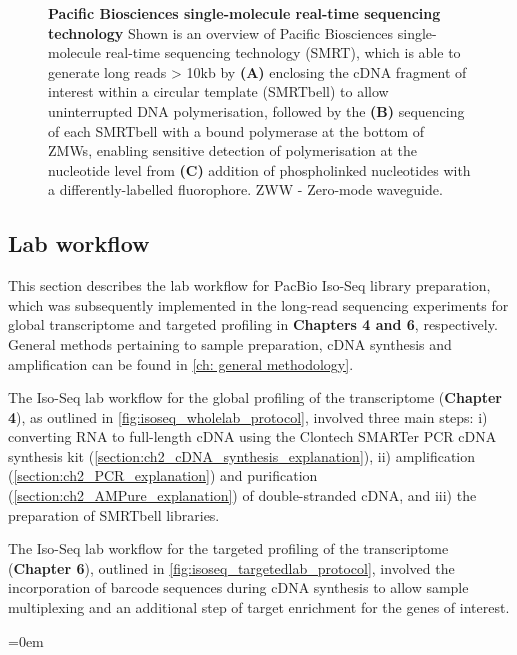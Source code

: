 \begin{figure}[!h]
	\captionsetup{width=0.95\textwidth}
	\caption[Pacific Biosciences single-molecule real-time sequencing technology]%
	{\textbf{Pacific Biosciences single-molecule real-time sequencing technology} Shown is an overview of Pacific Biosciences single-molecule real-time sequencing technology (SMRT), which is able to generate long reads > 10kb by \textbf{(A)} enclosing the cDNA fragment of interest within a circular template (SMRTbell) to allow uninterrupted DNA polymerisation,  followed by the \textbf{(B)} sequencing of each SMRTbell with a bound polymerase at the bottom of ZMWs, enabling sensitive detection of polymerisation at the nucleotide level from \textbf{(C)} addition of phospholinked nucleotides with a differently-labelled fluorophore. ZWW - Zero-mode waveguide.}
	\label{fig:Mechanism}
\end{figure}

\clearpage
\subsection{Lab workflow}
\label{chap:isoseq_labpipeline}
This section describes the lab workflow for PacBio Iso-Seq library preparation, which was subsequently implemented in the long-read sequencing experiments for global transcriptome and targeted profiling in \textbf{Chapters 4 and 6}, respectively. General methods pertaining to sample preparation, cDNA synthesis and amplification can be found in \cref{ch: general methodology}.

The Iso-Seq lab workflow for the global profiling of the transcriptome (\textbf{Chapter 4}), as outlined in \cref{fig:isoseq_wholelab_protocol}, involved three main steps: i) converting RNA to full-length cDNA using the Clontech SMARTer PCR cDNA synthesis kit (\cref{section:ch2_cDNA_synthesis_explanation}), ii) amplification (\cref{section:ch2_PCR_explanation}) and purification (\cref{section:ch2_AMPure_explanation}) of double-stranded cDNA, and iii) the preparation of SMRTbell libraries. 

The Iso-Seq lab workflow for the targeted profiling of the transcriptome (\textbf{Chapter 6}), outlined in \cref{fig:isoseq_targetedlab_protocol}, involved the incorporation of barcode sequences during cDNA synthesis to allow sample multiplexing and an additional step of target enrichment for the genes of interest.

\vspace{3cm}
\begingroup
\parindent=0em
\localtableofcontents 
\endgroup

